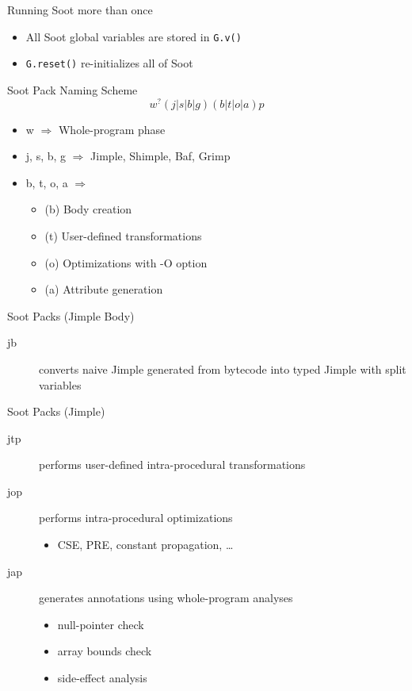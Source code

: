 \begin{slide}{Running Soot more than once}
\begin{itemize}
\item All Soot global variables are stored in \texttt{G.v()}
\item \texttt{G.reset()} re-initializes all of Soot
\end{itemize}
\end{slide}



\begin{slide}{Soot Pack Naming Scheme}
\[ w^? (j|s|b|g) (b|t|o|a)p \]

\begin{itemize}
\item w $\Rightarrow$ Whole-program phase
\item j, s, b, g $\Rightarrow$ Jimple, Shimple, Baf, Grimp
\item b, t, o, a $\Rightarrow$
\begin{itemize}
\item (b) Body creation
\item (t) User-defined transformations
\item (o) Optimizations with -O option
\item (a) Attribute generation
\end{itemize}
\end{itemize}
\end{slide}


\begin{slide}{Soot Packs (Jimple Body)}
\begin{description}
\item[jb] converts naive Jimple generated from bytecode into
typed Jimple with split variables
\end{description}
\end{slide}

\begin{slide}{Soot Packs (Jimple)}
\begin{description}
\item[jtp] performs user-defined intra-procedural transformations
\item[jop] performs intra-procedural optimizations
\begin{itemize}
\item CSE, PRE, constant propagation, \ldots
\end{itemize}
\item[jap] generates annotations using whole-program analyses
\begin{itemize}
\item null-pointer check
\item array bounds check
\item side-effect analysis
\end{itemize}
\end{description}
\end{slide}

